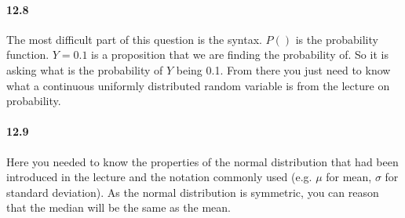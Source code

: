 \documentclass{article}
\begin{document}
\paragraph{12.8} The most difficult part of this question is the syntax. $P()$ is the probability function. $Y=0.1$ is a proposition that we are finding the probability of. So it is asking what is the probability of $Y$ being 0.1. From there you just need to know what a continuous uniformly distributed random variable is from the lecture on probability.

\paragraph{12.9} Here you needed to know the properties of the normal distribution that had been introduced in the lecture and the notation commonly used (e.g. $\mu$ for mean, $\sigma$ for standard deviation). As the normal distribution is symmetric, you can reason that the median will be the same as the mean. 
\end{document}

